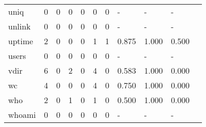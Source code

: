 \begin{longtable}{lp{1.10cm}p{1.10cm}p{1.10cm}p{1.10cm}p{1.10cm}p{1.10cm}p{1.10cm}p{1.10cm}p{1.10cm}p{1.10cm}}
uniq      &                      0 &                                  0 &                                 0 &                                0 &                                 0 &                               0 &                              - &                                     - &                                   - \\
unlink    &                      0 &                                  0 &                                 0 &                                0 &                                 0 &                               0 &                              - &                                     - &                                   - \\
uptime    &                      2 &                                  0 &                                 0 &                                0 &                                 1 &                               1 &                          0.875 &                                 1.000 &                               0.500 \\
users     &                      0 &                                  0 &                                 0 &                                0 &                                 0 &                               0 &                              - &                                     - &                                   - \\
vdir      &                      6 &                                  0 &                                 2 &                                0 &                                 4 &                               0 &                          0.583 &                                 1.000 &                               0.000 \\
wc        &                      4 &                                  0 &                                 0 &                                0 &                                 4 &                               0 &                          0.750 &                                 1.000 &                               0.000 \\
who       &                      2 &                                  0 &                                 1 &                                0 &                                 1 &                               0 &                          0.500 &                                 1.000 &                               0.000 \\
whoami    &                      0 &                                  0 &                                 0 &                                0 &                                 0 &                               0 &                              - &                                     - &                                   - \\

\end{longtable}
